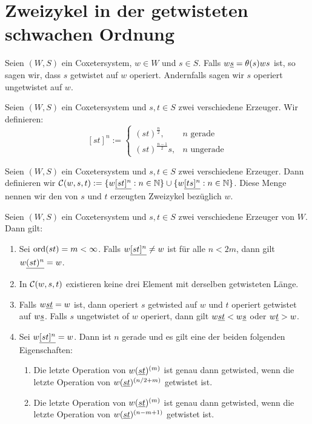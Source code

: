 \section{Zweizykel in der getwisteten schwachen Ordnung}

\begin{defi}
Seien $(W,S)$ ein Coxetersystem, $w \in W$ und $s \in S$. Falls $w \underline{s} =
\theta(s)ws$ ist, so sagen wir, dass $s$ getwistet auf $w$ operiert. Andernfalls
sagen wir $s$ operiert ungetwistet auf $w$.
\end{defi}

\begin{defi}
Seien $(W,S)$ ein Coxetersystem und $s,t \in S$ zwei
verschiedene Erzeuger. Wir definieren:
$$[st]^n :=
\begin{cases}
(st)^{\frac{n}{2}}, & n \textrm{ gerade} \\
(st)^{\frac{n-1}{2}}s, & n \textrm{ ungerade} 
\end{cases}$$
\end{defi}

\begin{defi}[Zweizykel]
Seien $(W,S)$ ein Coxetersystem und $s,t \in S$ zwei verschiedene Erzeuger. Dann
definieren wir $\mathcal{C}({w},{s},{t}) := \{ w \underline{[st]^n} : n \in \mathbb{N} \} \cup \{ w
\underline{[ts]^n} : n \in \mathbb{N} \}$. Diese Menge nennen wir den von $s$ und $t$
erzeugten Zweizykel bezüglich $w$.
\end{defi}

\begin{verm}
Seien $(W,S)$ ein Coxetersystem und $s,t \in S$ zwei verschiedene Erzeuger
von $W$. Dann gilt:
\begin{enumerate}
  \item \label{verm:max-twocycle-length} Sei $\operatorname{ord}(st) = m < \infty$. Falls $w \underline{[st]^n}
  \neq w$ ist für alle $n < 2m$, dann gilt $w \underline{(st)^n} = w$.
  \item \label{verm:twocycle-is-convex} In $\mathcal{C}({w},{s},{t})$ existieren keine drei
  Element mit derselben getwisteten Länge.
  \item Falls $w \underline{st} = w$ ist, dann operiert $s$ getwisted auf $w$ und $t$
  operiert getwistet auf $w \underline{s}$.
  \label{verm:untwisted-operations-only-at-top-or-bottom-end-of-twocycle}
  Falls $s$ ungetwistet of $w$ operiert, dann gilt $w \underline{st} < w \underline{s}$ oder $w \underline{t} > w$.
  \item \label{verm:twocycle-symmetry} Sei $w \underline{[st]^n} = w$. Dann ist $n$
  gerade und es gilt eine der beiden folgenden Eigenschaften:
  	\begin{enumerate}
  	  \item Die letzte Operation von $w (\underline{st})^{(m)}$ ist genau dann
  	  getwisted, wenn die letzte Operation von $w (\underline{st})^{(n/2+m)}$ getwistet
  	  ist.
  	  \item Die letzte Operation von $w (\underline{st})^{(m)}$ ist genau dann
  	  getwisted, wenn die letzte Operation von $w (\underline{st})^{(n-m+1)}$ getwistet
  	  ist.
  	\end{enumerate}
\end{enumerate}
\end{verm}

